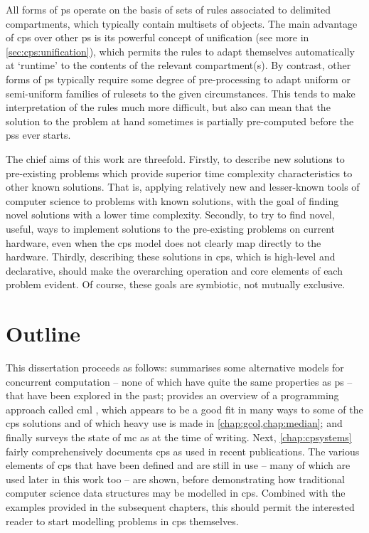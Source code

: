 All forms of \gls{ps} operate on the basis of sets of rules associated to delimited compartments, which typically contain multisets of objects. The main advantage of \gls{cps} over other \gls{ps} is its powerful concept of unification (see more in \vref{sec:cps:unification}), which permits the rules to adapt themselves automatically at `runtime' to the contents of the relevant compartment(s).  By contrast, other forms of \gls{ps} typically require some degree of pre-processing to adapt uniform or semi-uniform families of \glspl{ruleset} to the given circumstances.  This tends to make interpretation of the rules much more difficult, but also can mean that the solution to the problem at hand sometimes is partially pre-computed before the \glspl{ps} ever starts.

The chief aims of this work are threefold.  Firstly, to describe new solutions to pre-existing problems which provide superior time complexity characteristics to other known solutions.  That is, applying relatively new and lesser-known tools of computer science to problems with known solutions, with the goal of finding novel solutions with a lower time complexity.  Secondly, to try to find novel, useful, ways to implement solutions to the pre-existing problems on current hardware, even when the \gls{cps} model does not clearly map directly to the hardware.  Thirdly, describing these solutions in \gls{cps}, which is high-level and declarative, should make the overarching operation and core elements of each problem evident.  Of course, these goals are symbiotic, not mutually exclusive.

\section{Outline}

This dissertation proceeds as follows:  summarises some alternative models for concurrent computation -- none of which have quite the same properties as \gls{ps} -- that have been explored in the past; provides an overview of a programming approach called \gls{cml} \cite{Reppy2007,Reppy1991}, which appears to be a good fit in many ways to some of the \gls{cps} solutions and of which heavy use is made in \cref{chap:gcol,chap:median}; and finally surveys the state of \gls{mc} as at the time of writing.  Next, \cref{chap:cpsystems} fairly comprehensively documents \gls{cps} as used in recent publications.  The various elements of \gls{cps} that have been defined and are still in use -- many of which are used later in this work too -- are shown, before demonstrating how traditional computer science data structures may be modelled in \gls{cps}.  Combined with the examples provided in the subsequent chapters, this should permit the interested reader to start modelling problems in \gls{cps} themselves.

